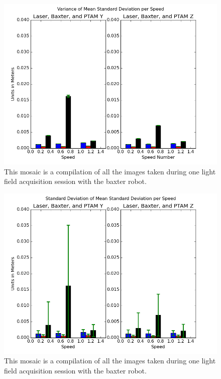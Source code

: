 \documentclass[12pt]{report}
\begin{document}
\begin{figure}[!ht]
	\centering
	\includegraphics[scale=0.55]{bax_and_ptam_var.png}
	\caption{This mosaic is a compilation of all the images taken during one light field acquisition session with the baxter robot.}
	\label{fig:bax_ptam_variance}
\end{figure}

\begin{figure}[!ht]
	\centering
	\includegraphics[scale=0.55]{bax_and_ptam_std_dev.png}
	\caption{This mosaic is a compilation of all the images taken during one light field acquisition session with the baxter robot.}
	\label{fig:bax_ptam_std_dev}
\end{figure}
\end{document}
